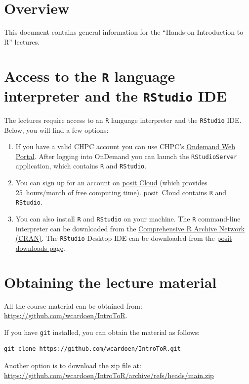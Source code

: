 \section*{Overview}

This document contains general information for the ``Hands-on Introduction to R'' lectures.

\section{Access to the \texttt{R} language interpreter and the \texttt{RStudio} IDE}

The lectures require access to an \texttt{R} language interpreter and the \texttt{RStudio} IDE.
Below, you will find a few options:

\begin{enumerate}
  \item If you have a valid CHPC account you can use CHPC's
        \href{http://ondemand.chpc.utah.edu/}{Ondemand Web Portal}.
        After logging into OnDemand you can launch the \texttt{RStudioServer} application,
        which contains \texttt{R} and \texttt{RStudio}.

  \item You can sign up for an account on
        \href{https://posit.cloud/}{posit Cloud}
        (which provides 25~hours/month of free computing time).
        posit~Cloud contains \texttt{R} and \texttt{RStudio}.

  \item You can also install \texttt{R} and \texttt{RStudio} on your machine.
        The \texttt{R} command-line interpreter can be downloaded from the
        \href{https://cran.r-project.org/}{Comprehensive R Archive Network (CRAN)}.
        The \texttt{RStudio} Desktop IDE can be downloaded from the
        \href{https://posit.co/downloads/}{posit downloads page}.
\end{enumerate}


\section{Obtaining the lecture material}

All the course material can be obtained from:
\href{https://github.com/wcardoen/IntroToR}{https://github.com/wcardoen/IntroToR}.

If you have \texttt{git} installed, you can obtain the material as follows:
\begin{verbatim}
git clone https://github.com/wcardoen/IntroToR.git
\end{verbatim}

Another option is to download the zip file at:\\
\href{https://github.com/wcardoen/IntroToR/archive/refs/heads/main.zip}{%
  https://github.com/wcardoen/IntroToR/archive/refs/heads/main.zip}
